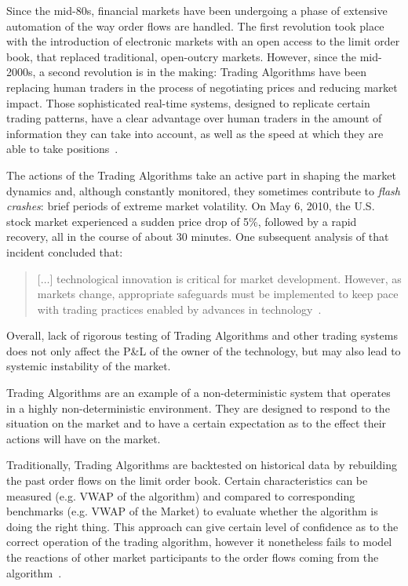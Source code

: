 Since the mid-80s, financial markets have been undergoing a phase of extensive automation of the way order flows are handled. The first revolution took place with the introduction of electronic markets with an open access to the limit order book, that replaced traditional, open-outcry markets. However, since the mid-2000s, a second revolution is in the making: Trading Algorithms have been replacing human traders in the process of negotiating prices and reducing market impact. Those sophisticated real-time systems, designed to replicate certain trading patterns, have a clear advantage over human traders in the amount of information they can take into account, as well as the speed at which they are able to take positions~\cite{Lenglet}.

The actions of the Trading Algorithms take an active part in shaping the market dynamics and, although constantly monitored, they sometimes contribute to \emph{flash crashes}: brief periods of extreme market volatility. On May 6, 2010, the U.S. stock market experienced a sudden price drop of 5\%, followed by a rapid recovery, all in the course of about 30 minutes. One subsequent analysis of that incident concluded that:
\begin{quote}
[$\ldots$] technological innovation is critical for market development. However, as markets change, appropriate safeguards must be implemented to keep pace with trading practices enabled by advances in technology~\cite{Kirilenko2011}.
\end{quote}
Overall, lack of rigorous testing of Trading Algorithms and other trading systems does not only affect the P\&L  of the owner of the technology, but may also lead to systemic instability of the market.

Trading Algorithms are an example of a non-deterministic system that operates in a highly non-deterministic environment. They are designed to respond to the situation on the market and to have a certain expectation as to the effect their actions will have on the market.

Traditionally, Trading Algorithms are backtested on historical data by rebuilding the past order flows on the limit order book. Certain characteristics can be measured (e.g. VWAP of the algorithm) and compared to corresponding benchmarks (e.g. VWAP of the Market) to evaluate whether the algorithm is doing the right thing. This approach can give certain level of confidence as to the correct operation of the trading algorithm, however it nonetheless fails to model the reactions of other market participants to the order flows coming from the algorithm~\cite{Coggins2006}.

